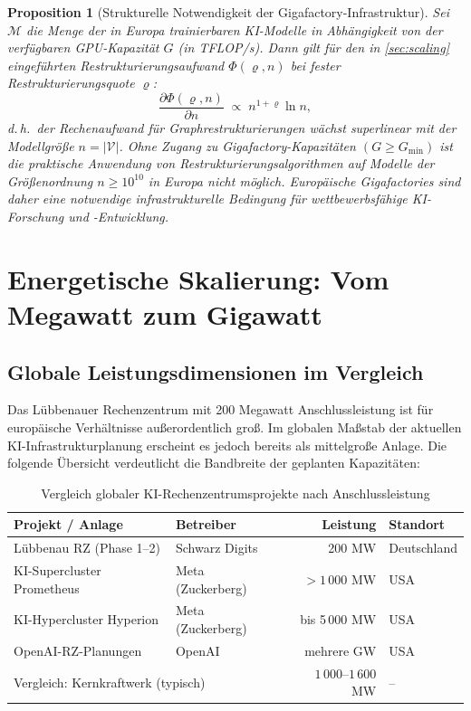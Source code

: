 \documentclass[12pt, a4paper, openany]{report}
\newtheorem{proposition}[theorem]{Proposition}
\newcommand{\calV}{\mathcal{V}}
\begin{document}
\begin{proposition}[Strukturelle Notwendigkeit der Gigafactory-Infrastruktur]
	\label{prop:gigafactory_notwendigkeit}
	Sei $\mathcal{M}$ die Menge der in Europa trainierbaren KI-Modelle in
	Abhängigkeit von der verfügbaren GPU-Kapazität $G$ (in TFLOP/s). Dann
	gilt für den in \cref{sec:scaling} eingeführten Restrukturierungsaufwand
	$\Phi(\varrho, n)$ bei fester Restrukturierungsquote $\varrho$:
	\[
	\frac{\partial \Phi(\varrho, n)}{\partial n}
	\;\propto\; n^{1 + \varrho} \ln n,
	\]
	d.\,h.\ der Rechenaufwand für Graphrestrukturierungen wächst
	superlinear mit der Modellgröße $n = |\calV|$. Ohne Zugang zu
	Gigafactory-Kapazitäten $(G \geq G_{\min})$ ist die praktische Anwendung
	von Restrukturierungsalgorithmen auf Modelle der Größenordnung $n \geq 10^{10}$
	in Europa nicht möglich. Europäische Gigafactories sind daher eine
	\emph{notwendige} infrastrukturelle Bedingung für wettbewerbsfähige
	KI-Forschung und -Entwicklung.
\end{proposition}

\section{Energetische Skalierung: Vom Megawatt zum Gigawatt}
\label{sec:energetische_skalierung}

\subsection{Globale Leistungsdimensionen im Vergleich}

Das Lübbenauer Rechenzentrum mit 200 Megawatt Anschlussleistung ist für
europäische Verhältnisse außerordentlich groß. Im globalen Maßstab der
aktuellen KI-Infrastrukturplanung erscheint es jedoch bereits als
mittelgroße Anlage. Die folgende Übersicht verdeutlicht die Bandbreite
der geplanten Kapazitäten:

\begin{table}[H]
	\centering
	\caption{Vergleich globaler KI-Rechenzentrumsprojekte nach Anschlussleistung}
	\label{tab:leistungsvergleich}
	\begin{tabularx}{0.88\textwidth}{l l r l}
		\toprule
		\textbf{Projekt / Anlage} & \textbf{Betreiber} & \textbf{Leistung} & \textbf{Standort} \\
		\midrule
		Lübbenau RZ (Phase 1--2)  & Schwarz Digits & 200 MW  & Deutschland \\
		KI-Supercluster Prometheus & Meta (Zuckerberg) & $> 1\,000$ MW  & USA \\
		KI-Hypercluster Hyperion   & Meta (Zuckerberg) & bis 5\,000 MW   & USA \\
		OpenAI-RZ-Planungen        & OpenAI & mehrere GW   & USA \\
		\midrule
		\multicolumn{2}{l}{Vergleich: Kernkraftwerk (typisch)} & $1\,000$--$1\,600$ MW & -- \\
		\bottomrule
	\end{tabularx}
\end{table}
\end{document}
